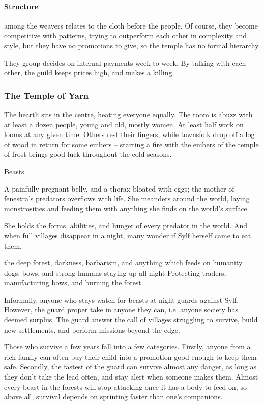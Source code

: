 \begin{multicols}{2}
\paragraph{Structure}
among the weavers relates to the cloth before the people.
Of course, they become competitive with patterns, trying to outperform each other in complexity and style, but they have no promotions to give, so the temple has no formal hierarchy.

They group decides on internal payments week to week.
By talking with each other, the guild keeps prices high, and makes a killing.

\subsubsection{The Temple of Yarn}

The hearth sits in the centre, heating everyone equally.
The room is abuzz with at least a dozen people, young and old, mostly women.
At least half work on looms at any given time.
Others rest their fingers, while townsfolk drop off a log of wood in return for some embers -- starting a fire with the embers of the temple of frost brings good luck throughout the cold seasons.


  {Beasts}%
  {%
    A painfully pregnant belly, and a thorax bloated with eggs; the mother of \gls{fenestra}'s predators overflows with life.
    She meanders around the world, laying monstrosities and feeding them with anything she finds on the world's surface.

    She holds the forms, abilities, and hunger of every predator in the world.
    And when full villages disappear in a night, many wonder if Sylf herself came to eat them.
  }%
  {the deep forest, darkness, barbarism, and anything which feeds on humanity}%
  {dogs, bows, and strong humans staying up all night}%
  {}%
  {
    Protecting traders, manufacturing bows, and burning the forest.
  }%

Informally, anyone who stays watch for beasts at night guards against Sylf.
However, the \gls{guard} proper take in anyone they can, i.e. anyone society has deemed surplus.
The \gls{guard} answer the call of villages struggling to survive, build new settlements, and perform missions beyond the \gls{edge}.

Those who survive a few years fall into a few categories.
Firstly, anyone from a rich family can often buy their child into a promotion good enough to keep them safe.
Secondly, the fastest of the \gls{guard} can survive almost any danger, as long as they don't take the lead often, and stay alert when someone makes them.
Almost every beast in the forests will stop attacking once it has a body to feed on, so above all, survival depends on sprinting faster than one's companions.


\end{multicols}
